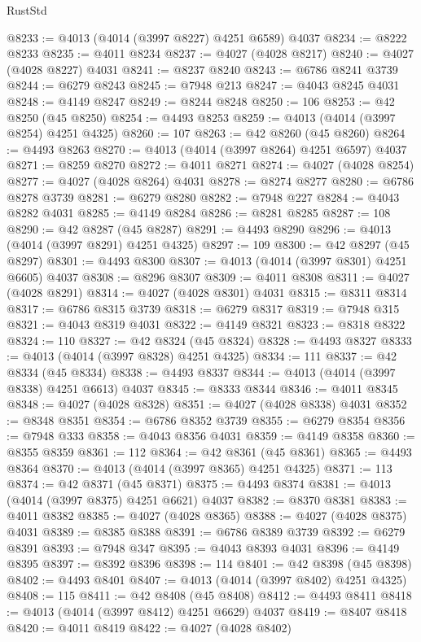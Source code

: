 \begin{lexlean}{RustStd}
\begin{coremodule}
@8233 := @4013 (@4014 (@3997 @8227) @4251 @6589) @4037
@8234 := @8222 @8233
@8235 := @4011 @8234
@8237 := @4027 (@4028 @8217)
@8240 := @4027 (@4028 @8227) @4031
@8241 := @8237 @8240
@8243 := @6786 @8241 @3739
@8244 := @6279 @8243
@8245 := @7948 @213
@8247 := @4043 @8245 @4031
@8248 := @4149 @8247
@8249 := @8244 @8248
@8250 := 106
@8253 := @42 @8250 (@45 @8250)
@8254 := @4493 @8253
@8259 := @4013 (@4014 (@3997 @8254) @4251 @4325)
@8260 := 107
@8263 := @42 @8260 (@45 @8260)
@8264 := @4493 @8263
@8270 := @4013 (@4014 (@3997 @8264) @4251 @6597) @4037
@8271 := @8259 @8270
@8272 := @4011 @8271
@8274 := @4027 (@4028 @8254)
@8277 := @4027 (@4028 @8264) @4031
@8278 := @8274 @8277
@8280 := @6786 @8278 @3739
@8281 := @6279 @8280
@8282 := @7948 @227
@8284 := @4043 @8282 @4031
@8285 := @4149 @8284
@8286 := @8281 @8285
@8287 := 108
@8290 := @42 @8287 (@45 @8287)
@8291 := @4493 @8290
@8296 := @4013 (@4014 (@3997 @8291) @4251 @4325)
@8297 := 109
@8300 := @42 @8297 (@45 @8297)
@8301 := @4493 @8300
@8307 := @4013 (@4014 (@3997 @8301) @4251 @6605) @4037
@8308 := @8296 @8307
@8309 := @4011 @8308
@8311 := @4027 (@4028 @8291)
@8314 := @4027 (@4028 @8301) @4031
@8315 := @8311 @8314
@8317 := @6786 @8315 @3739
@8318 := @6279 @8317
@8319 := @7948 @315
@8321 := @4043 @8319 @4031
@8322 := @4149 @8321
@8323 := @8318 @8322
@8324 := 110
@8327 := @42 @8324 (@45 @8324)
@8328 := @4493 @8327
@8333 := @4013 (@4014 (@3997 @8328) @4251 @4325)
@8334 := 111
@8337 := @42 @8334 (@45 @8334)
@8338 := @4493 @8337
@8344 := @4013 (@4014 (@3997 @8338) @4251 @6613) @4037
@8345 := @8333 @8344
@8346 := @4011 @8345
@8348 := @4027 (@4028 @8328)
@8351 := @4027 (@4028 @8338) @4031
@8352 := @8348 @8351
@8354 := @6786 @8352 @3739
@8355 := @6279 @8354
@8356 := @7948 @333
@8358 := @4043 @8356 @4031
@8359 := @4149 @8358
@8360 := @8355 @8359
@8361 := 112
@8364 := @42 @8361 (@45 @8361)
@8365 := @4493 @8364
@8370 := @4013 (@4014 (@3997 @8365) @4251 @4325)
@8371 := 113
@8374 := @42 @8371 (@45 @8371)
@8375 := @4493 @8374
@8381 := @4013 (@4014 (@3997 @8375) @4251 @6621) @4037
@8382 := @8370 @8381
@8383 := @4011 @8382
@8385 := @4027 (@4028 @8365)
@8388 := @4027 (@4028 @8375) @4031
@8389 := @8385 @8388
@8391 := @6786 @8389 @3739
@8392 := @6279 @8391
@8393 := @7948 @347
@8395 := @4043 @8393 @4031
@8396 := @4149 @8395
@8397 := @8392 @8396
@8398 := 114
@8401 := @42 @8398 (@45 @8398)
@8402 := @4493 @8401
@8407 := @4013 (@4014 (@3997 @8402) @4251 @4325)
@8408 := 115
@8411 := @42 @8408 (@45 @8408)
@8412 := @4493 @8411
@8418 := @4013 (@4014 (@3997 @8412) @4251 @6629) @4037
@8419 := @8407 @8418
@8420 := @4011 @8419
@8422 := @4027 (@4028 @8402)

\end{coremodule}
\end{lexlean}
